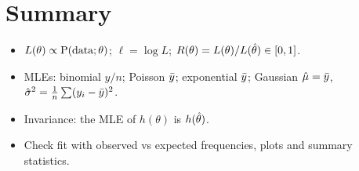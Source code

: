 \section*{Summary}
\begin{itemize}
  \item $L(\theta) \propto \operatorname{P}(\text{data};\theta)$; $\ell = \log L$;
        $R(\theta) = L(\theta)/L(\hat{\theta})\in[0,1]$.
  \item MLEs: binomial $y/n$; Poisson $\bar{y}$; exponential $\bar{y}$; Gaussian
        $\hat\mu=\bar{y}$, $\hat\sigma^2 = \frac1n\sum(y_i-\bar{y})^2$.
  \item Invariance: the MLE of $h(\theta)$ is $h(\hat{\theta})$.
  \item Check fit with observed vs expected frequencies, plots and summary statistics.
\end{itemize}

